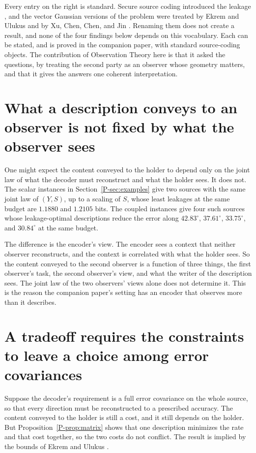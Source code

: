 \documentclass[11pt]{article}
\newcommand{\Pp}[1]{Proposition~\ref{P-#1}}
\newcommand{\Se}[1]{Section~\ref{P-#1}}
\begin{document}
Every entry on the right is standard. Secure source coding introduced
the leakage \cite{villard2013}, and the vector Gaussian versions of the
problem were treated by Ekrem and Ulukus \cite{ekrem2013} and by Xu,
Chen, Chen, and Jin \cite{xu2024}. Renaming them does not create a
result, and none of the four findings below depends on this vocabulary.
Each can be stated, and is proved in the companion paper, with standard
source-coding objects. The contribution of Observation Theory here is
that it asked the questions, by treating the second party as an observer
whose geometry matters, and that it gives the answers one coherent
interpretation.

\section{What a description conveys to an observer is not fixed by what the observer sees}
\label{sec:notdetermined}

One might expect the content conveyed to the holder to depend only on
the joint law of what the decoder must reconstruct and what the holder
sees. It does not. The scalar instances in \Se{sec:examples} give two
sources with the same joint law of $(Y,S)$, up to a scaling of $S$, whose
least leakages at the same budget are $1.1880$ and $1.2105$ bits. The
coupled instances give four such sources whose leakage-optimal
descriptions reduce the error along $42.83^\circ$, $37.61^\circ$,
$33.75^\circ$, and $30.84^\circ$ at the same budget.

The difference is the encoder's view. The encoder sees a context that
neither observer reconstructs, and the context is correlated with what
the holder sees. So the content conveyed to the second observer is a
function of three things, the first observer's task, the second
observer's view, and what the writer of the description sees. The joint
law of the two observers' views alone does not determine it. This is the
reason
the companion paper's setting has an encoder that observes more than it
describes.

\section{A tradeoff requires the constraints to leave a choice among error covariances}
\label{sec:scalarbudget}

Suppose the decoder's requirement is a full error covariance on the whole
source, so that every direction must be reconstructed to a prescribed
accuracy. The content conveyed to the holder is still a cost, and it
still depends on the holder. But \Pp{prop:matrix} shows that one
description minimizes the rate and that cost together, so the two costs
do not conflict. The result is implied by the bounds of Ekrem and Ulukus
\cite{ekrem2013}.
\end{document}
